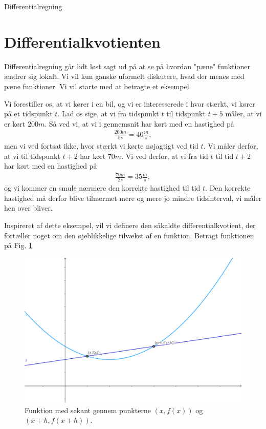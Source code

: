 \begin{center}
\Huge
Differentialregning
\end{center}
\section*{Differentialkvotienten}

Differentialregning går lidt løst sagt ud på at se på hvordan "pæne" funktioner ændrer sig lokalt. Vi vil kun ganske uformelt diskutere, hvad der menes med pæne funktioner. Vi vil starte med at betragte et eksempel.
\begin{exa}
Vi forestiller os, at vi kører i en bil, og vi er interesserede i hvor stærkt, vi kører på et tidspunkt $t$. Lad os sige, at vi fra tidspunkt $t$ til tidspunkt $t+5$ måler, at vi er kørt $200m$. Så ved vi, at vi i gennemsnit har kørt med en hastighed på
\begin{align*}
\frac{200m}{5s} = 40\frac{m}{s},
\end{align*} 
men vi ved fortsat ikke, hvor stærkt vi kørte nøjagtigt ved tid $t$. Vi måler derfor, at vi til tidspunkt $t+2$ har kørt $70m$. Vi ved derfor, at vi fra tid $t$ til tid $t+2$ har kørt med en hastighed på 
\begin{align*}
\frac{70m}{2s} = 35\frac{m}{s},
\end{align*}
og vi kommer en smule nærmere den korrekte hastighed til tid $t$. Den korrekte hastighed må derfor blive tilnærmet mere og mere jo mindre tidsinterval, vi måler hen over bliver. 
\end{exa}
Inspireret af dette eksempel, vil vi definere den såkaldte differentialkvotient, der fortæller noget om den øjeblikkelige tilvækst af en funktion. 
Betragt funktionen på Fig. \ref{fig:sek1}
\begin{figure}[H]
\centering
\includegraphics[width = 12cm]{Billeder/sekant1.png}
\caption{Funktion med sekant gennem punkterne $(x,f(x))$ og $(x+h,f(x+h))$.}
\label{fig:sek1}
\end{figure}
